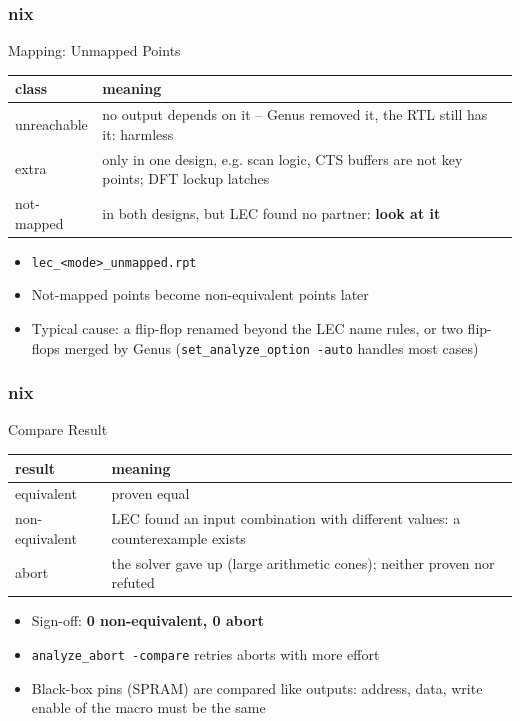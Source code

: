 \documentclass{beamer}
\newcommand{\astitle}{nix}
\newcommand{\assubtitle}{nix}
\newcommand{\cmd}[1]{\texttt{#1}}
\begin{document}
\renewcommand{\assubtitle}{Mapping: Unmapped Points}
\begin{frame}
\frametitle{\astitle}
\begin{block}{\assubtitle}
  \footnotesize
  \begin{tabularx}{\linewidth}{@{}lY@{}}
    \textbf{class} & \textbf{meaning}\\\hline
    unreachable & no output depends on it -- Genus removed it, the RTL
                  still has it: harmless\\
    extra       & only in one design, e.g. scan logic, CTS buffers
                  are not key points; DFT lockup latches\\
    not-mapped  & in both designs, but LEC found no partner:
                  \textbf{look at it}\\
  \end{tabularx}
  \vspace{4pt}
  \begin{itemize}
    \item \cmd{lec\_<mode>\_unmapped.rpt}
    \item Not-mapped points become non-equivalent points later
    \item Typical cause: a flip-flop renamed beyond the LEC name rules,
      or two flip-flops merged by Genus (\cmd{set\_analyze\_option
      -auto} handles most cases)
  \end{itemize}
\end{block}
\end{frame}

\renewcommand{\assubtitle}{Compare Result}
\begin{frame}
\frametitle{\astitle}
\begin{block}{\assubtitle}
  \footnotesize
  \begin{tabularx}{\linewidth}{@{}lY@{}}
    \textbf{result} & \textbf{meaning}\\\hline
    equivalent     & proven equal\\
    non-equivalent & LEC found an input combination with different
                     values: a counterexample exists\\
    abort          & the solver gave up (large arithmetic cones);
                     neither proven nor refuted\\
  \end{tabularx}
  \vspace{4pt}
  \begin{itemize}
    \item Sign-off: \textbf{0 non-equivalent, 0 abort}
    \item \cmd{analyze\_abort -compare} retries aborts with more effort
    \item Black-box pins (SPRAM) are compared like outputs: address,
      data, write enable of the macro must be the same
  \end{itemize}
\end{block}
\end{frame}
\end{document}
